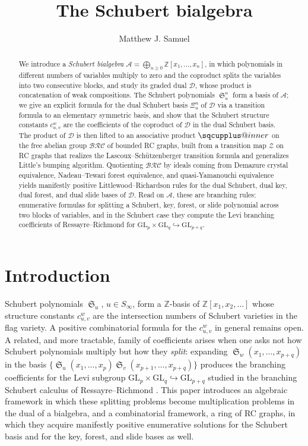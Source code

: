 \documentclass{amsart}
\title{The Schubert bialgebra}
\author{Matthew J. Samuel}
\makeatletter
\newcommand{\sqcupplus@inner}[2]{%
  \vcenter{\hbox{\ooalign{%
    \hfil$\m@th#1\sqcup$\hfil\cr
    \hfil\raisebox{0.15ex}{$\m@th#1\scriptscriptstyle+$}\hfil\cr
  }}}%
}
\newcommand{\sqcupplus}{\mathbin{\mathpalette\sqcupplus@inner\relax}}
\theoremstyle{definition}
\theoremstyle{remark}
\numberwithin{equation}{subsection}
\DeclareMathOperator{\sch}{\mathfrak{S}}
\newcommand{\zeromap}{\mathcal{Z}}
\newcommand{\BRC}{\mathcal{BRC}}
\newcommand{\dsch}{\ensuremath{\Xi}}
\newcommand{\coma}{\mathcal{A}}
\newcommand{\dcoma}{\mathcal{D}}
\makeatother
\begin{document}
\begin{abstract}
We introduce a \emph{Schubert bialgebra} $\coma=\bigoplus_{n\geq 0}\mathbb{Z}[x_1,\ldots,x_n]$, in which polynomials in different numbers of variables multiply to zero and the coproduct splits the variables into two consecutive blocks, and study its graded dual $\dcoma$, whose product is concatenation of weak compositions. The Schubert polynomials $\sch_u^n$ form a basis of $\coma$; we give an explicit formula for the dual Schubert basis $\dsch_u^n$ of $\dcoma$ via a transition formula to an elementary symmetric basis, and show that the Schubert structure constants $c_{u,v}^w$ are the coefficients of the coproduct of $\dcoma$ in the dual Schubert basis. The product of $\dcoma$ is then lifted to an associative product $\sqcupplus$ on the free abelian group $\BRC$ of bounded RC graphs, built from a transition map $\zeromap$ on RC graphs that realizes the Lascoux--Sch\"utzenberger transition formula and generalizes Little's bumping algorithm. Quotienting $\BRC$ by ideals coming from Demazure crystal equivalence, Nadeau--Tewari forest equivalence, and quasi-Yamanouchi equivalence yields manifestly positive Littlewood--Richardson rules for the dual Schubert, dual key, dual forest, and dual slide bases of $\dcoma$. Read on $\coma$, these are branching rules: enumerative formulas for splitting a Schubert, key, forest, or slide polynomial across two blocks of variables, and in the Schubert case they compute the Levi branching coefficients of Ressayre--Richmond for $\mathrm{GL}_p\times\mathrm{GL}_q\hookrightarrow\mathrm{GL}_{p+q}$.
\end{abstract}

	\maketitle


\section{Introduction}

Schubert polynomials $\sch_u$, $u\in S_\infty$, form a $\mathbb{Z}$-basis of $\mathbb{Z}[x_1,x_2,\ldots]$ whose structure constants $c_{u,v}^w$ are the intersection numbers of Schubert varieties in the flag variety. A positive combinatorial formula for the $c_{u,v}^w$ in general remains open. A related, and more tractable, family of coefficients arises when one asks not how Schubert polynomials multiply but how they \emph{split}: expanding $\sch_w(x_1,\ldots,x_{p+q})$ in the basis $\{\sch_u(x_1,\ldots,x_p)\sch_v(x_{p+1},\ldots,x_{p+q})\}$ produces the branching coefficients for the Levi subgroup $\mathrm{GL}_p\times\mathrm{GL}_q\hookrightarrow\mathrm{GL}_{p+q}$ studied in the branching Schubert calculus of Ressayre--Richmond \cite{ressayre2009branching}. This paper introduces an algebraic framework in which these splitting problems become multiplication problems in the dual of a bialgebra, and a combinatorial framework, a ring of RC graphs, in which they acquire manifestly positive enumerative solutions for the Schubert basis and for the key, forest, and slide bases as well.
\end{document}
